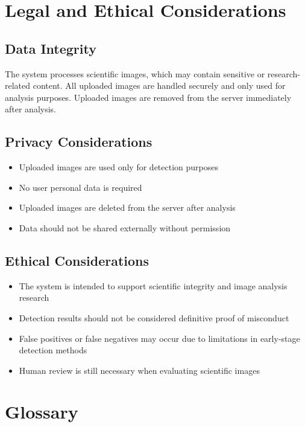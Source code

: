 \documentclass[12pt]{article}
\begin{document}
\section{Legal and Ethical Considerations}

\subsection{Data Integrity}

The system processes scientific images, which may contain sensitive or
research-related content. All uploaded images are handled securely and only used for
analysis purposes. Uploaded images are removed from the server immediately after
analysis.

\subsection{Privacy Considerations}

\begin{itemize}
    \item Uploaded images are used only for detection purposes
    \item No user personal data is required
    \item Uploaded images are deleted from the server after analysis
    \item Data should not be shared externally without permission
\end{itemize}

\subsection{Ethical Considerations}

\begin{itemize}
    \item The system is intended to support scientific integrity and image analysis research
    \item Detection results should not be considered definitive proof of misconduct
    \item False positives or false negatives may occur due to limitations in early-stage detection methods
    \item Human review is still necessary when evaluating scientific images
\end{itemize}

\section{Glossary}
\end{document}

